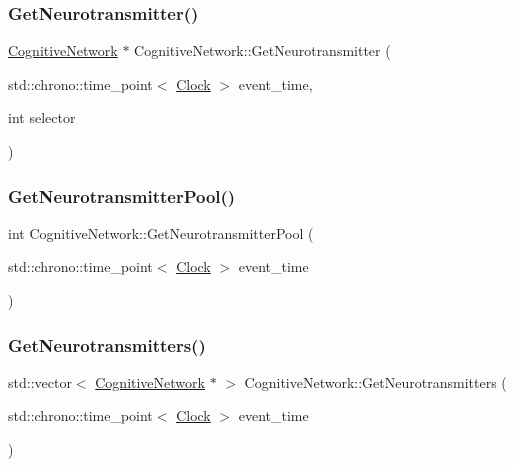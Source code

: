 \mbox{\label{classCognitiveNetwork_a85890c201376061b1ffbe8fdfc1a8633}} 
\subsubsection{\texorpdfstring{Get\+Neurotransmitter()}{GetNeurotransmitter()}}
{\footnotesize\ttfamily \mbox{\hyperlink{classCognitiveNetwork}{Cognitive\+Network}} $\ast$ Cognitive\+Network\+::\+Get\+Neurotransmitter (\begin{DoxyParamCaption}\item[{std\+::chrono\+::time\+\_\+point$<$ \mbox{\hyperlink{universe_8h_a0ef8d951d1ca5ab3cfaf7ab4c7a6fd80}{Clock}} $>$}]{event\+\_\+time,  }\item[{int}]{selector }\end{DoxyParamCaption})}

\mbox{\label{classCognitiveNetwork_a4e5b1d60cda4ddb4bd04d8dca42b7a5b}} 
\subsubsection{\texorpdfstring{Get\+Neurotransmitter\+Pool()}{GetNeurotransmitterPool()}}
{\footnotesize\ttfamily int Cognitive\+Network\+::\+Get\+Neurotransmitter\+Pool (\begin{DoxyParamCaption}\item[{std\+::chrono\+::time\+\_\+point$<$ \mbox{\hyperlink{universe_8h_a0ef8d951d1ca5ab3cfaf7ab4c7a6fd80}{Clock}} $>$}]{event\+\_\+time }\end{DoxyParamCaption})\hspace{0.3cm}{\ttfamily [inline]}}

\mbox{\label{classCognitiveNetwork_ac56b1585864b372c8897dcb5720d00a7}} 
\subsubsection{\texorpdfstring{Get\+Neurotransmitters()}{GetNeurotransmitters()}}
{\footnotesize\ttfamily std\+::vector$<$ \mbox{\hyperlink{classCognitiveNetwork}{Cognitive\+Network}} $\ast$ $>$ Cognitive\+Network\+::\+Get\+Neurotransmitters (\begin{DoxyParamCaption}\item[{std\+::chrono\+::time\+\_\+point$<$ \mbox{\hyperlink{universe_8h_a0ef8d951d1ca5ab3cfaf7ab4c7a6fd80}{Clock}} $>$}]{event\+\_\+time }\end{DoxyParamCaption})}

